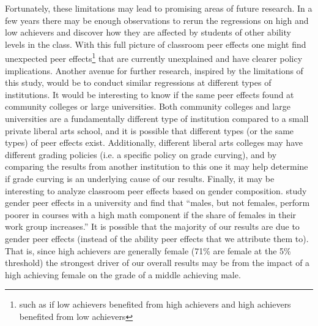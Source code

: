 Fortunately, these limitations may lead to promising areas of future research. 
In a few years there may be enough observations to rerun the regressions on high and low achievers and discover how they are affected by students of other ability levels in the class. 
With this full picture of classroom peer effects one might find unexpected peer effects\footnote{such as if low achievers benefited from high achievers and high achievers benefited from low achievers} that are currently unexplained and have clearer policy implications.
Another avenue for further research, inspired by the limitations of this study, would be to conduct similar regressions at different types of institutions.
It would be interesting to know if the same peer effects found at community colleges or large universities. 
Both community colleges and large universities are a fundamentally different type of institution compared to a small private liberal arts school, and it is possible that different types (or the same types) of peer effects exist. 
Additionally, different liberal arts colleges may have different grading policies (i.e. a specific policy on grade curving), and by comparing the results from another institution to this one it may help determine if grade curving is an underlying cause of our results. 
Finally, it may be interesting to analyze classroom peer effects based on gender composition. 
\citet{oosterbeek2014gender} study gender peer effects in a university and find that ``males, but not females, perform poorer in courses with a high math component if the share of females in their work group increases.'' 
It is possible that the majority of our results are due to gender peer effects (instead of the ability peer effects that we attribute them to). 
That is, since high achievers are generally female (71\% are female at the 5\% threshold) the strongest driver of our overall results may be from the impact of a high achieving female on the grade of a middle achieving male. 


